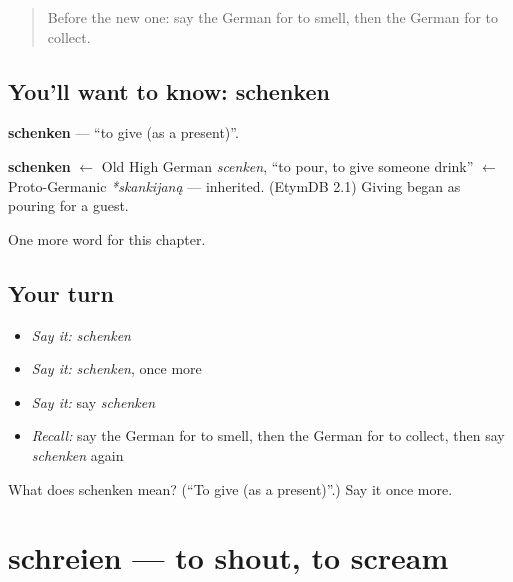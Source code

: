 \label{lesson:GE-C149-schenken}



\begin{quote}
Before the new one: say the German for to smell, then the German for to collect.
\end{quote}

\subsection*{You'll want to know: schenken}
\textbf{schenken} — \textquotedblleft{}to give (as a present)\textquotedblright{}.

\begin{cousinweb}
\textbf{schenken} $\leftarrow$ Old High German \emph{scenken}, \textquotedblleft{}to pour, to give someone drink\textquotedblright{} $\leftarrow$ Proto-Germanic \emph{*skankijaną} — inherited. (EtymDB 2.1) Giving began as pouring for a guest.
\end{cousinweb}

\begin{grammarlens}[title={What you've built}]
One more word for this chapter.
\end{grammarlens}

\subsection*{Your turn}
\begin{itemize}
\raggedright
  \item \emph{Say it:} \emph{schenken}
  \item \emph{Say it:} \emph{schenken}, once more
  \item \emph{Say it:} say \emph{schenken}
  \item \emph{Recall:} say the German for to smell, then the German for to collect, then say \emph{schenken} again
\end{itemize}

\begin{tcolorbox}[breakable,colback=teal!4,colframe=teal!35!black,title={Before you move on}]
What does schenken mean? (\textquotedblleft{}To give (as a present)\textquotedblright{}.) Say it once more.
\end{tcolorbox}
\section[schreien]{schreien — to shout, to scream}

\label{lesson:GE-C149-schreien}



